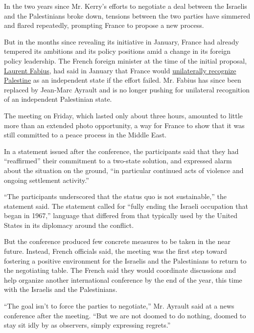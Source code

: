 In the two years since Mr. Kerry's efforts to negotiate a deal between
the Israelis and the Palestinians broke down, tensions between the two
parties have simmered and flared repeatedly, prompting France to propose
a new process.

But in the months since revealing its initiative in January, France had
already tempered its ambitions and its policy positions amid a change in
its foreign policy leadership. The French foreign minister at the time
of the initial proposal,
\href{http://www.nytimes3xbfgragh.onion/2016/02/11/world/europe/laurent-fabius-france-resignation.html}{Laurent
Fabius}, had said in January that France would
\href{http://www.nytimes3xbfgragh.onion/2016/01/30/world/middleeast/france-plans-mideast-peace-effort-and-recognition-of-palestine-if-it-fails.html}{unilaterally
recognize Palestine} as an independent state if the effort failed. Mr.
Fabius has since been replaced by Jean-Marc Ayrault and is no longer
pushing for unilateral recognition of an independent Palestinian state.

The meeting on Friday, which lasted only about three hours, amounted to
little more than an extended photo opportunity, a way for France to show
that it was still committed to a peace process in the Middle East.

In a statement issued after the conference, the participants said that
they had ``reaffirmed'' their commitment to a two-state solution, and
expressed alarm about the situation on the ground, ``in particular
continued acts of violence and ongoing settlement activity.''

``The participants underscored that the status quo is not sustainable,''
the statement said. The statement called for ``fully ending the Israeli
occupation that began in 1967,'' language that differed from that
typically used by the United States in its diplomacy around the
conflict.

But the conference produced few concrete measures to be taken in the
near future. Instead, French officials said, the meeting was the first
step toward fostering a positive environment for the Israelis and the
Palestinians to return to the negotiating table. The French said they
would coordinate discussions and help organize another international
conference by the end of the year, this time with the Israelis and the
Palestinians.

``The goal isn't to force the parties to negotiate,'' Mr. Ayrault said
at a news conference after the meeting. ``But we are not doomed to do
nothing, doomed to stay sit idly by as observers, simply expressing
regrets.''

